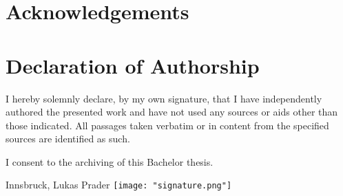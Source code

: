 \documentclass[12pt,a4paper]{article}
\begin{document}
\section{Acknowledgements} \label{sec:acknowledgements}


\clearpage
\section*{Declaration of Authorship}

I hereby solemnly declare, by my own signature, that I have independently authored the presented work and have not used any sources or aids other than those indicated. All passages taken verbatim or in content from the specified sources are identified as such.

I consent to the archiving of this Bachelor thesis.

\hfill
\vspace{2cm} Innsbruck, \findate \hfill Lukas Prader \texttt{[image: "signature.png"]}


\newpage
\printbibliography[]

\end{document}

